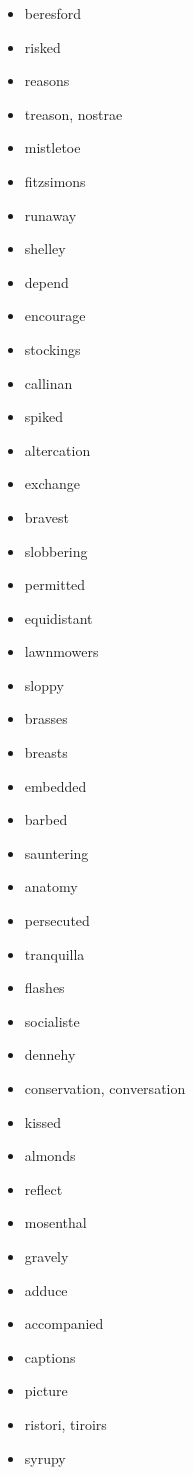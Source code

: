 \documentclass{article}
\begin{document}
\begin{itemize}
    \item beresford
    \item risked
    \item reasons
    \item treason, nostrae
    \item mistletoe
    \item fitzsimons
    \item runaway
    \item shelley
    \item depend
    \item encourage
    \item stockings
    \item callinan
    \item spiked
    \item altercation
    \item exchange
    \item bravest
    \item slobbering
    \item permitted
    \item equidistant
    \item lawnmowers
    \item sloppy
    \item brasses
    \item breasts
    \item embedded
    \item barbed
    \item sauntering
    \item anatomy
    \item persecuted
    \item tranquilla
    \item flashes
    \item socialiste
    \item dennehy
    \item conservation, conversation
    \item kissed
    \item almonds
    \item reflect
    \item mosenthal
    \item gravely
    \item adduce
    \item accompanied
    \item captions
    \item picture
    \item ristori, tiroirs
    \item syrupy

\end{itemize}
\end{document}
